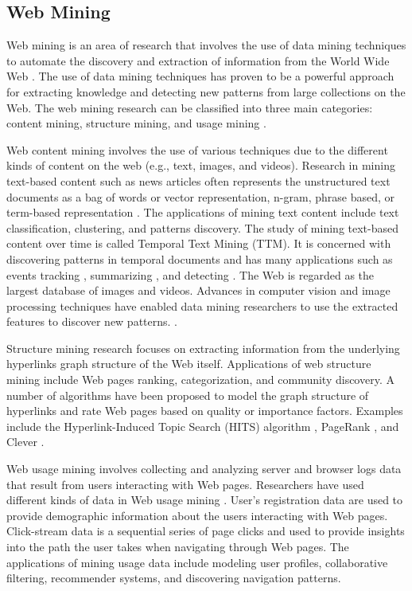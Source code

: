 \subsection{Web Mining}
Web mining is an area of research that involves the use of data mining techniques to automate the discovery and extraction of information from the World Wide Web \cite{etzioni_1996_Communication_ACM}.
The use of data mining techniques has proven to be a powerful approach for extracting knowledge and detecting new patterns from large collections on the Web.
The web mining research can be classified into three main categories: content mining, structure mining, and usage mining \cite{madria_1999_Springer,kosala_2000_Survey}.

Web content mining involves the use of various techniques due to the different kinds of content on the web (e.g., text, images, and videos).
Research in mining text-based content such as news articles often represents the unstructured text documents as a bag of words or vector representation, n-gram, phrase based, or term-based representation \cite{manning_2008_intro_to_IR}.
The applications of mining text content include text classification, clustering, and  patterns discovery.
The study of mining text-based content over time is called Temporal Text Mining (TTM).
It is concerned with discovering patterns in temporal documents and has many applications such as events tracking \cite{ha_2009_IR}, summarizing \cite{Mei_2005_KDD}, and detecting \cite{huang_2014_WWW}.
The Web is regarded as the largest database of images and videos.
Advances in computer vision and image processing techniques have enabled data mining researchers to use the extracted features to discover new patterns. \cite{Wang_2011_SIGIR, Wu_2011_WSDM}.

Structure mining research focuses on extracting information from the underlying hyperlinks graph structure of the Web itself.
Applications of web structure mining include Web pages ranking, categorization, and community discovery.
A number of algorithms have been proposed to model the graph structure of hyperlinks and rate Web pages based on quality or importance factors. Examples include the Hyperlink-Induced Topic Search (HITS) algorithm \cite{Kleinberg_1999_JACM}, PageRank \cite{Brin_1998_PageRank}, and Clever \cite{chakrabarti_1999_Computer}.

Web usage mining involves collecting and analyzing server and browser logs data that result from users interacting with Web pages.
Researchers have used different kinds of data in Web usage mining 
\cite{srivastava_2000_KDDNewsLetter}.
User's registration data are used to provide demographic information about the users interacting with Web pages.
Click-stream data is a sequential series of page clicks and used to provide insights into the path the user takes when navigating through Web pages.
The applications of mining usage data include modeling user profiles, collaborative filtering, recommender systems, and discovering navigation patterns.
